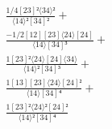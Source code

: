\documentclass[varwidth, border=5pt]{standalone}
\begin{document}
\begin{my}
$\begin{gathered}
\scriptscriptstyle\frac{1/4[23]²⟨34⟩²}{⟨14⟩²[34]²} +\\
\scriptscriptstyle\frac{-1/2[12][23]⟨24⟩[24]}{⟨14⟩[34]³} +\\
\scriptscriptstyle\frac{1[23]²⟨24⟩[24]⟨34⟩}{⟨14⟩²[34]³} +\\
\scriptscriptstyle\frac{1[13][23]⟨24⟩[24]²}{⟨14⟩[34]⁴} +\\
\scriptscriptstyle\frac{1[23]²⟨24⟩²[24]²}{⟨14⟩²[34]⁴} \phantom{+}
\end{gathered}$
\end{my}
\end{document}
